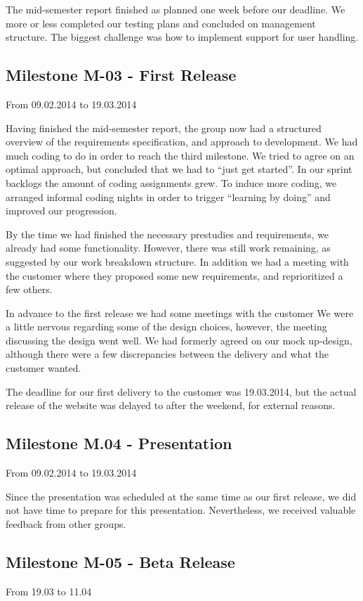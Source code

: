 The mid-semester report finished as planned one week before our deadline. We
more or less completed our testing plans and concluded on management structure.
The biggest challenge was how to implement support for user handling. 

\subsection{Milestone M-03 - First Release}
\label{sec:M03}
From 09.02.2014 to 19.03.2014

Having finished the mid-semester report, the group now had a structured
overview of the requirements specification, and approach to development. We had
much coding to do in order to reach the third milestone. We tried to agree on
an optimal approach, but concluded that we had to ``just get started''. In our
sprint backlogs the amount of coding assignments grew. To induce more coding,
we arranged informal coding nights in order to trigger ``learning by doing''
and improved our progression.

By the time we had finished the necessary prestudies and requirements, we
already had some functionality. However, there was still work remaining, as
suggested by our work breakdown structure. In addition we had a meeting with
the customer where they proposed some new requirements, and reprioritized a few
others. 

In advance to the first release we had some meetings with the customer We
were a little nervous regarding some of the design choices, however, the
meeting discussing the design went well. We had formerly agreed on our mock
up-design, although there were a few discrepancies between the delivery and
what the customer wanted.

The deadline for our first delivery to the customer was 19.03.2014, but the
actual release of the website was delayed to after the weekend, for external
reasons. 

\subsection{Milestone M.04 - Presentation}
\label{sec:M04}
From 09.02.2014 to 19.03.2014

Since the presentation was scheduled at the same time as our first
release, we did not have time to prepare for this presentation.
Nevertheless, we received valuable feedback from other groups.

\subsection{Milestone M-05 - Beta Release}
\label{sec:M05}
From 19.03 to 11.04

